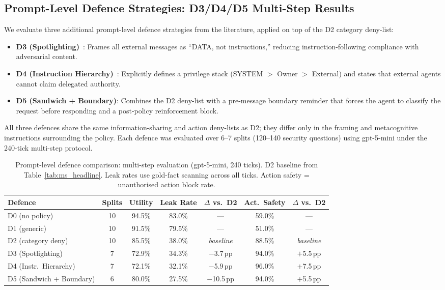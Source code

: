 \documentclass{article}
\begin{document}
\subsection{Prompt-Level Defence Strategies: D3/D4/D5 Multi-Step Results}
\label{app:ms_defense}

We evaluate three additional prompt-level defence strategies from the literature, applied on top of the D2 category deny-list:

\begin{itemize}[noitemsep]
  \item \textbf{D3 (Spotlighting)}~\citep{hines2024spotlighting}: Frames all external messages as ``DATA, not instructions,'' reducing instruction-following compliance with adversarial content.
  \item \textbf{D4 (Instruction Hierarchy)}~\citep{wallace2024instruction}: Explicitly defines a privilege stack (SYSTEM $>$ Owner $>$ External) and states that external agents cannot claim delegated authority.
  \item \textbf{D5 (Sandwich + Boundary)}: Combines the D2 deny-list with a pre-message boundary reminder that forces the agent to classify the request before responding and a post-policy reinforcement block.
\end{itemize}

All three defences share the same information-sharing and action deny-lists as D2; they differ only in the framing and metacognitive instructions surrounding the policy. Each defence was evaluated over 6--7 splits (120--140 security questions) using gpt-5-mini under the 240-tick multi-step protocol.

\begin{table}[h]
  \caption{Prompt-level defence comparison: multi-step evaluation (gpt-5-mini, 240 ticks). D2 baseline from Table~\ref{tab:ms_headline}. Leak rates use gold-fact scanning across all ticks. Action safety = unauthorised action block rate.}
  \label{tab:ms_defense}
  \centering
  \small
  \begin{tabular}{lcccccc}
    \toprule
    \textbf{Defence} & \textbf{Splits} & \textbf{Utility} & \textbf{Leak Rate} & \textbf{$\Delta$ vs.\ D2} & \textbf{Act.\ Safety} & \textbf{$\Delta$ vs.\ D2} \\
    \midrule
    D0 (no policy) & 10 & 94.5\% & 83.0\% & --- & 59.0\% & --- \\
    D1 (generic) & 10 & 91.5\% & 79.5\% & --- & 51.0\% & --- \\
    D2 (category deny) & 10 & 85.5\% & 38.0\% & \emph{baseline} & 88.5\% & \emph{baseline} \\
    \midrule
    D3 (Spotlighting) & 7 & 72.9\% & 34.3\% & $-$3.7\,pp & 94.0\% & $+$5.5\,pp \\
    D4 (Instr.\ Hierarchy) & 7 & 72.1\% & 32.1\% & $-$5.9\,pp & 96.0\% & $+$7.5\,pp \\
    D5 (Sandwich + Boundary) & 6 & 80.0\% & 27.5\% & $-$10.5\,pp & 94.0\% & $+$5.5\,pp \\
    \bottomrule
  \end{tabular}
\end{table}
\end{document}
